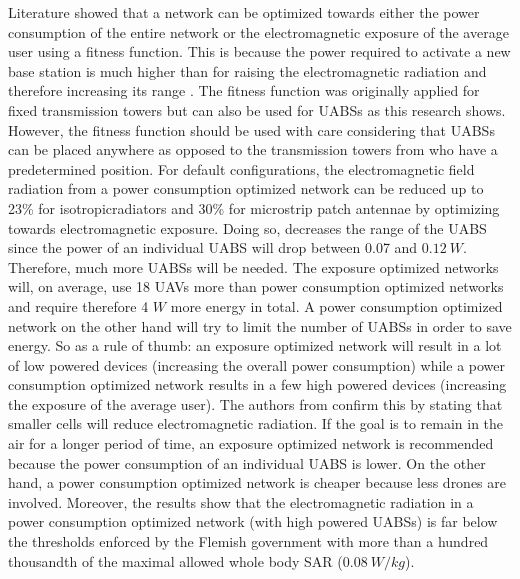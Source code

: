 Literature showed that a network can be optimized towards either the power consumption of the entire network 
or the electromagnetic exposure of the average user using a fitness function. This is because the power required to activate a new 
base station is much higher than for raising the electromagnetic radiation and therefore increasing its range \cite{J1}.
The fitness function was originally applied for fixed transmission towers but can also be used 
for \gls{UABS}s as this research shows.
However, the fitness function should be used with care considering that \gls{UABS}s can be placed anywhere as opposed to 
the transmission towers from \cite{J1} who have a predetermined position.  
For default configurations, the electromagnetic field radiation from a
power consumption optimized network can be reduced up to 23\% for \gls{isotropicradiator}s and 30\% for microstrip patch antennae 
by optimizing towards electromagnetic exposure. Doing so, decreases the range of the \gls{UABS}  since the power of an individual \gls{UABS} will 
drop between 0.07 and $0.12\ W$. Therefore, much more \gls{UABS}s will be needed. 
The exposure optimized networks will, on average, use 18 \gls{UAV}s more than power consumption optimized networks
and require therefore 4 $W$ more energy in total.
A power consumption optimized network on the other hand will try to limit the number of \gls{UABS}s 
in order to save energy.
 So as a rule of thumb: an exposure optimized network will result in a lot of low powered devices (increasing the overall power consumption)
while a power consumption optimized network results in a few high powered devices (increasing the exposure of the average user).
The authors from \cite{J17_kuehn2019modelling} confirm this by stating that smaller cells will reduce electromagnetic radiation. 
If the goal is to remain in the air for a longer period of time, an exposure optimized network is recommended because the power consumption of 
an individual \gls{UABS} is lower.
On the other hand, a power consumption optimized network is cheaper because less drones are involved.
Moreover, the results show that the electromagnetic radiation in a power consumption optimized network (with high powered \gls{UABS}s)
is far below the thresholds enforced by the Flemish government with more than a hundred thousandth of the maximal allowed whole body \gls{SAR} ($0.08\ W/kg$).


